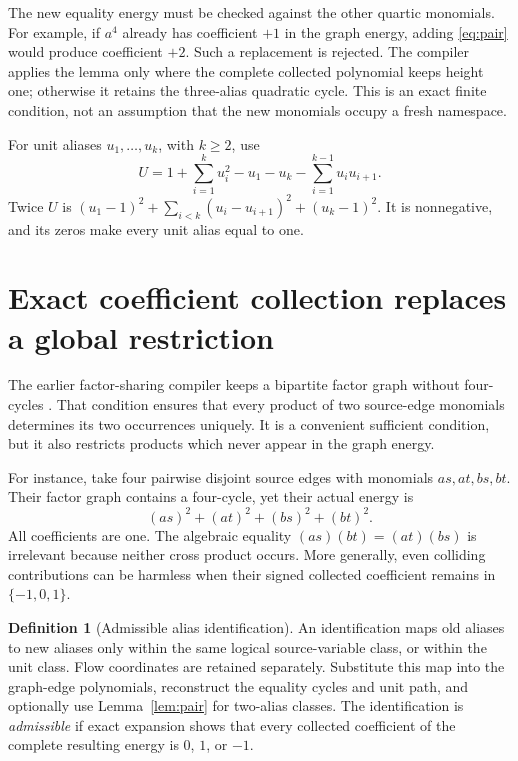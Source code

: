 \documentclass[11pt,letterpaper]{article}
\theoremstyle{definition}\newtheorem{definition}[theorem]{Definition}
\theoremstyle{remark}\newtheorem{remark}[theorem]{Remark}
\begin{document}
The new equality energy must be checked against the other quartic
monomials. For example, if $a^4$ already has coefficient $+1$ in the graph
energy, adding \eqref{eq:pair} would produce coefficient $+2$. Such a
replacement is rejected. The compiler applies the lemma only where the
complete collected polynomial keeps height one; otherwise it retains the
three-alias quadratic cycle. This is an exact finite condition, not an
assumption that the new monomials occupy a fresh namespace.

For unit aliases $u_1,\ldots,u_k$, with $k\geq2$, use
\begin{equation}\label{eq:unit-path}
 U=1+\sum_{i=1}^k u_i^2-u_1-u_k-
                          \sum_{i=1}^{k-1}u_i u_{i+1}.
\end{equation}
Twice $U$ is
$(u_1-1)^2+\sum_{i<k}(u_i-u_{i+1})^2+(u_k-1)^2$.
It is nonnegative, and its zeros make every unit alias equal to one.

\section{Exact coefficient collection replaces a global restriction}
\label{sec:quotient}

The earlier factor-sharing compiler keeps a bipartite factor graph without
four-cycles \cite{graph127}. That condition ensures that every product of
two source-edge monomials determines its two occurrences uniquely. It is
a convenient sufficient condition, but it also restricts products which
never appear in the graph energy.

For instance, take four pairwise disjoint source edges with monomials
$as,at,bs,bt$. Their factor graph contains a four-cycle, yet their actual
energy is
\[
 (as)^2+(at)^2+(bs)^2+(bt)^2.
\]
All coefficients are one. The algebraic equality $(as)(bt)=(at)(bs)$ is
irrelevant because neither cross product occurs. More generally, even
colliding contributions can be harmless when their signed collected
coefficient remains in $\{-1,0,1\}$.

\begin{definition}[Admissible alias identification]
An identification maps old aliases to new aliases only within the same
logical source-variable class, or within the unit class. Flow coordinates
are retained separately. Substitute this map into the graph-edge
polynomials, reconstruct the equality cycles and unit path, and optionally
use Lemma~\ref{lem:pair} for two-alias classes. The identification is
\emph{admissible} if exact expansion shows that every collected coefficient
of the complete resulting energy is $0$, $1$, or $-1$.
\end{definition}
\end{document}
